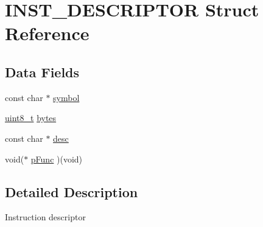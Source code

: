 \hypertarget{struct_i_n_s_t___d_e_s_c_r_i_p_t_o_r}{\section{I\-N\-S\-T\-\_\-\-D\-E\-S\-C\-R\-I\-P\-T\-O\-R Struct Reference}
\label{struct_i_n_s_t___d_e_s_c_r_i_p_t_o_r}
}
\subsection*{Data Fields}
\begin{DoxyCompactItemize}
\item 
const char $\ast$ \hyperlink{struct_i_n_s_t___d_e_s_c_r_i_p_t_o_r_a59dc8c7d6529d6c482ba826dc393ea97}{symbol}
\item 
\hyperlink{6502_8cpp_aba7bc1797add20fe3efdf37ced1182c5}{uint8\-\_\-t} \hyperlink{struct_i_n_s_t___d_e_s_c_r_i_p_t_o_r_a03e7d28b32109105758ff0e4ba5c5434}{bytes}
\item 
const char $\ast$ \hyperlink{struct_i_n_s_t___d_e_s_c_r_i_p_t_o_r_ab1832944355704705dafef16c6ac98e5}{desc}
\item 
void($\ast$ \hyperlink{struct_i_n_s_t___d_e_s_c_r_i_p_t_o_r_a0f292185e54563dee359af8a98a8b7f7}{p\-Func} )(void)
\end{DoxyCompactItemize}


\subsection{Detailed Description}
Instruction descriptor 


